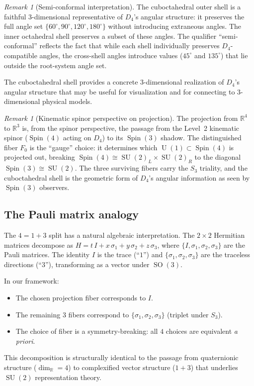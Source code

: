 \documentclass[11pt,reqno]{amsart}
\theoremstyle{plain}
\theoremstyle{definition}
\theoremstyle{remark}
\newtheorem{remark}[theorem]{Remark}
\newcommand{\R}{\mathbb{R}}
\DeclareMathOperator{\Spin}{Spin}
\DeclareMathOperator{\SO}{SO}
\DeclareMathOperator{\SU}{SU}
\DeclareMathOperator{\U}{U}
\begin{document}
\begin{remark}[Semi-conformal interpretation]
\label{rem:semiconformal}
The cuboctahedral outer shell is a faithful
$3$-dimensional representative of $D_4$'s angular
structure: it preserves the full angle set
$\{60^\circ, 90^\circ, 120^\circ, 180^\circ\}$ without
introducing extraneous angles.
The inner octahedral shell preserves a subset of these angles.
The qualifier ``semi-conformal'' reflects the fact that
while each shell individually preserves $D_4$-compatible
angles, the cross-shell angles introduce values ($45^\circ$
and $135^\circ$) that lie outside the root-system angle set.

The cuboctahedral shell provides a concrete
$3$-dimensional realization of $D_4$'s angular structure
that may be useful for visualization and for connecting
to $3$-dimensional physical models.
\end{remark}

\begin{remark}[Kinematic spinor perspective on projection]
\label{rem:projectionspinor}
The projection from $\R^4$ to $\R^3$ is, from the spinor
perspective, the passage from the Level~2 kinematic spinor
($\Spin(4)$ acting on $D_4$) to its $\Spin(3)$ shadow.
The distinguished fiber $F_0$ is the ``gauge'' choice:
it determines which $\U(1) \subset \Spin(4)$ is projected out,
breaking $\Spin(4) \cong \SU(2)_L \times \SU(2)_R$ to the
diagonal $\Spin(3) \cong \SU(2)$.
The three surviving fibers carry the $S_3$ triality,
and the cuboctahedral shell is the geometric form of
$D_4$'s angular information as seen by $\Spin(3)$ observers.
\end{remark}

\subsection{The Pauli matrix analogy}

The $4 = 1 + 3$ split has a natural algebraic interpretation.
The $2 \times 2$ Hermitian matrices decompose as
$H = t\, I + x\, \sigma_1 + y\, \sigma_2 + z\, \sigma_3$,
where $\{I, \sigma_1, \sigma_2, \sigma_3\}$ are the Pauli
matrices.
The identity $I$ is the trace (``$1$'') and
$\{\sigma_1, \sigma_2, \sigma_3\}$ are the traceless
directions (``$3$''), transforming as a vector under $\SO(3)$.

In our framework:
\begin{itemize}
\item The chosen projection fiber corresponds to $I$.
\item The remaining $3$ fibers correspond to
  $\{\sigma_1, \sigma_2, \sigma_3\}$ (triplet under $S_3$).
\item The choice of fiber is a symmetry-breaking:
  all $4$ choices are equivalent \emph{a priori}.
\end{itemize}
This decomposition is structurally identical to the passage
from quaternionic structure ($\dim_\R = 4$) to complexified
vector structure ($1 + 3$) that underlies $\SU(2)$
representation theory.
\end{document}
